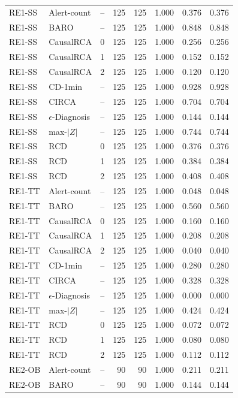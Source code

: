 {\begin{longtable}{llrrrrrr}
RE1-SS & Alert-count & -- & 125 & 125 & 1.000 & 0.376 & 0.376 \\
RE1-SS & BARO & -- & 125 & 125 & 1.000 & 0.848 & 0.848 \\
RE1-SS & CausalRCA & 0 & 125 & 125 & 1.000 & 0.256 & 0.256 \\
RE1-SS & CausalRCA & 1 & 125 & 125 & 1.000 & 0.152 & 0.152 \\
RE1-SS & CausalRCA & 2 & 125 & 125 & 1.000 & 0.120 & 0.120 \\
RE1-SS & CD-1min & -- & 125 & 125 & 1.000 & 0.928 & 0.928 \\
RE1-SS & CIRCA & -- & 125 & 125 & 1.000 & 0.704 & 0.704 \\
RE1-SS & $\epsilon$-Diagnosis & -- & 125 & 125 & 1.000 & 0.144 & 0.144 \\
RE1-SS & max-$|Z|$ & -- & 125 & 125 & 1.000 & 0.744 & 0.744 \\
RE1-SS & RCD & 0 & 125 & 125 & 1.000 & 0.376 & 0.376 \\
RE1-SS & RCD & 1 & 125 & 125 & 1.000 & 0.384 & 0.384 \\
RE1-SS & RCD & 2 & 125 & 125 & 1.000 & 0.408 & 0.408 \\
RE1-TT & Alert-count & -- & 125 & 125 & 1.000 & 0.048 & 0.048 \\
RE1-TT & BARO & -- & 125 & 125 & 1.000 & 0.560 & 0.560 \\
RE1-TT & CausalRCA & 0 & 125 & 125 & 1.000 & 0.160 & 0.160 \\
RE1-TT & CausalRCA & 1 & 125 & 125 & 1.000 & 0.208 & 0.208 \\
RE1-TT & CausalRCA & 2 & 125 & 125 & 1.000 & 0.040 & 0.040 \\
RE1-TT & CD-1min & -- & 125 & 125 & 1.000 & 0.280 & 0.280 \\
RE1-TT & CIRCA & -- & 125 & 125 & 1.000 & 0.328 & 0.328 \\
RE1-TT & $\epsilon$-Diagnosis & -- & 125 & 125 & 1.000 & 0.000 & 0.000 \\
RE1-TT & max-$|Z|$ & -- & 125 & 125 & 1.000 & 0.424 & 0.424 \\
RE1-TT & RCD & 0 & 125 & 125 & 1.000 & 0.072 & 0.072 \\
RE1-TT & RCD & 1 & 125 & 125 & 1.000 & 0.080 & 0.080 \\
RE1-TT & RCD & 2 & 125 & 125 & 1.000 & 0.112 & 0.112 \\
RE2-OB & Alert-count & -- & 90 & 90 & 1.000 & 0.211 & 0.211 \\
RE2-OB & BARO & -- & 90 & 90 & 1.000 & 0.144 & 0.144 \\

\end{longtable}}
